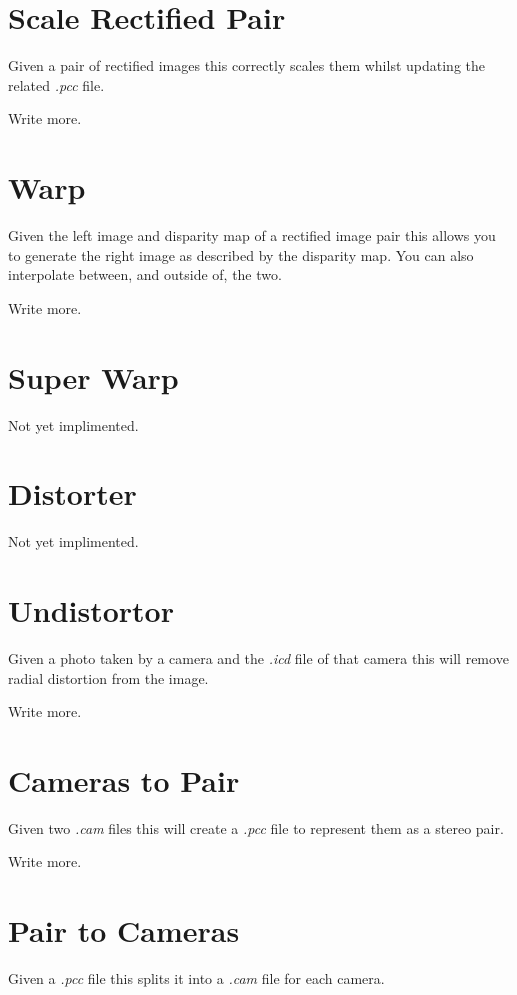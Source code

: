 \documentclass[10pt,a4paper,twoside]{article}
\begin{document}
\section{Scale Rectified Pair}
Given a pair of rectified images this correctly scales them whilst updating the related \emph{.pcc} file.

Write more.



\section{Warp}
Given the left image and disparity map of a rectified image pair this allows you to generate the right image as described by the disparity map. You can also interpolate between, and outside of, the two.

Write more.



\section{Super Warp}
Not yet implimented.



\section{Distorter}
Not yet implimented.



\section{Undistortor}
Given a photo taken by a camera and the \emph{.icd} file of that camera this will remove radial distortion from the image.

Write more.



\section{Cameras to Pair}
Given two \emph{.cam} files this will create a \emph{.pcc} file to represent them as a stereo pair.

Write more.



\section{Pair to Cameras}
Given a \emph{.pcc} file this splits it into a \emph{.cam} file for each camera.
\end{document}

